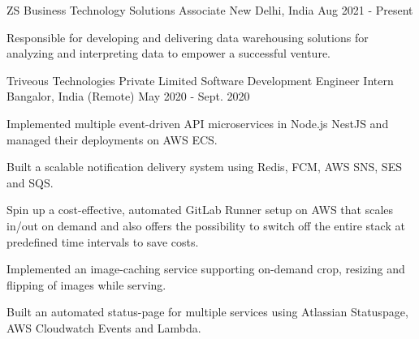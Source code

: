 

\begin{cventries}

  \cventry
    {ZS} %
    {Business Technology Solutions Associate} %
    {New Delhi, India} %
    {Aug 2021 - Present} %
    {
      \begin{cvitems} %
        \item {Responsible for developing and delivering data warehousing solutions for analyzing and interpreting data to empower a successful venture.}
      \end{cvitems}
    }

  \cventry
    {Triveous Technologies Private Limited} %
    {Software Development Engineer Intern} %
    {Bangalor, India (Remote)} %
    {May 2020 - Sept. 2020} %
    {
      \begin{cvitems} %
        \item {Implemented multiple event-driven API microservices in Node.js NestJS and managed their deployments on AWS ECS.}
        \item {Built a scalable notification delivery system using Redis, FCM, AWS SNS, SES and SQS.}
        \item {Spin up a cost-effective, automated GitLab Runner setup on AWS that scales in/out on demand and also offers the possibility to switch off the entire stack at predefined time intervals to save costs.}
        \item {Implemented an image-caching service supporting on-demand crop, resizing and flipping of images while serving.}
        \item {Built an automated status-page for multiple services using Atlassian Statuspage, AWS Cloudwatch Events and Lambda.}
      \end{cvitems}
    }


\end{cventries}
